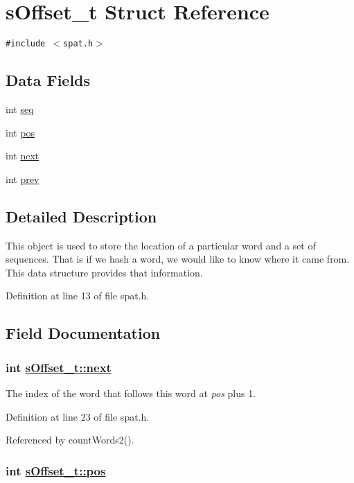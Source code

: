 \hypertarget{structsOffset__t}{
\section{s\-Offset\_\-t Struct Reference}
\label{structsOffset__t}
}
{\tt \#include $<$spat.h$>$}

\subsection*{Data Fields}
\begin{CompactItemize}
\item 
int \hyperlink{structsOffset__t_o0}{seq}
\item 
int \hyperlink{structsOffset__t_o1}{pos}
\item 
int \hyperlink{structsOffset__t_o2}{next}
\item 
int \hyperlink{structsOffset__t_o3}{prev}
\end{CompactItemize}


\subsection*{Detailed Description}
This object is used to store the location of a particular word and a set of sequences. That is if we hash a word, we would like to know where it came from. This data structure provides that information.



Definition at line 13 of file spat.h.

\subsection*{Field Documentation}
\hypertarget{structsOffset__t_o2}{
\subsubsection[next]{\setlength{\rightskip}{0pt plus 5cm}int \hyperlink{structsOffset__t_o2}{s\-Offset\_\-t::next}}}
\label{structsOffset__t_o2}


The index of the word that follows this word at {\em pos\/} plus 1.

Definition at line 23 of file spat.h.

Referenced by count\-Words2().\hypertarget{structsOffset__t_o1}{
\subsubsection[pos]{\setlength{\rightskip}{0pt plus 5cm}int \hyperlink{structsOffset__t_o1}{s\-Offset\_\-t::pos}}}
\label{structsOffset__t_o1}


